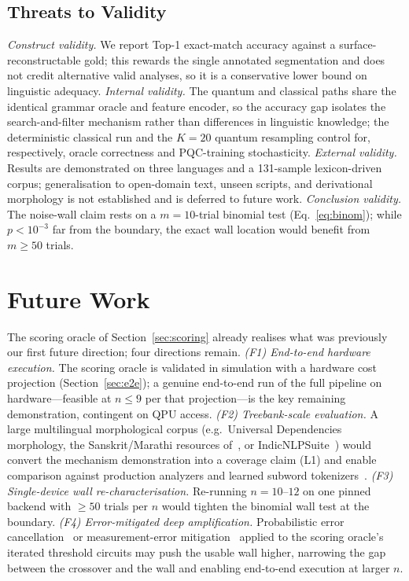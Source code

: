 \documentclass[journal]{IEEEtran}
\begin{document}
\subsection{Threats to Validity}
\emph{Construct validity.} We report Top-1 exact-match accuracy against a
surface-reconstructable gold; this rewards the single annotated segmentation and
does not credit alternative valid analyses, so it is a conservative lower bound on
linguistic adequacy. \emph{Internal validity.} The quantum and classical paths
share the identical grammar oracle and feature encoder, so the accuracy gap
isolates the search-and-filter mechanism rather than differences in linguistic
knowledge; the deterministic classical run and the $K{=}20$ quantum resampling
control for, respectively, oracle correctness and PQC-training stochasticity.
\emph{External validity.} Results are demonstrated on three languages and a
131-sample lexicon-driven corpus; generalisation to open-domain text, unseen
scripts, and derivational morphology is not established and is deferred to
future work. \emph{Conclusion validity.} The noise-wall claim rests on a
$m{=}10$-trial binomial test (Eq.~\ref{eq:binom}); while $p<10^{-3}$ far from the
boundary, the exact wall location would benefit from $m\!\ge\!50$ trials.

\section{Future Work}
\label{sec:future}
The scoring oracle of Section~\ref{sec:scoring} already realises what was
previously our first future direction; four directions remain.
\emph{(F1) End-to-end hardware execution.} The scoring oracle is validated in
simulation with a hardware cost projection (Section~\ref{sec:e2e}); a genuine
end-to-end run of the full pipeline on hardware---feasible at $n{\le}9$ per that
projection---is the key remaining demonstration, contingent on QPU access.
\emph{(F2) Treebank-scale evaluation.} A large multilingual morphological corpus
(e.g.\ Universal Dependencies morphology, the Sanskrit/Marathi resources
of~\cite{jha2009,bapat2010,huet2005}, or IndicNLPSuite~\cite{kakwani2020}) would
convert the mechanism demonstration into a coverage claim (L1) and enable
comparison against production analyzers and learned subword
tokenizers~\cite{sennrich2016,kudo2018}.
\emph{(F3) Single-device wall re-characterisation.} Re-running $n{=}10$--$12$ on
one pinned backend with $\ge50$ trials per $n$ would tighten the binomial wall
test at the boundary.
\emph{(F4) Error-mitigated deep amplification.} Probabilistic error
cancellation~\cite{temme2017} or measurement-error mitigation~\cite{nation2021}
applied to the scoring oracle's iterated threshold circuits may push the usable
wall higher, narrowing the gap between the crossover and the wall and enabling
end-to-end execution at larger $n$.
\end{document}
